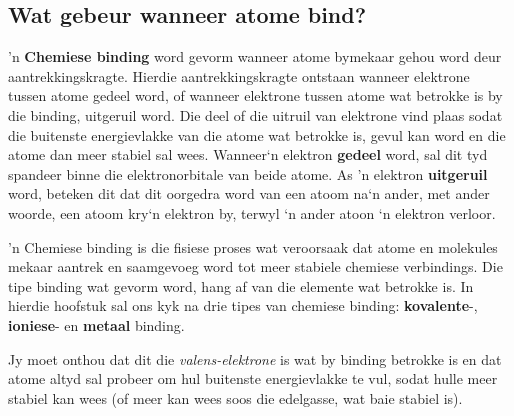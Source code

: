             \subsection*{Wat gebeur wanneer atome bind?}
            \nopagebreak
      \label{m38704*id138842}'n \textbf{Chemiese binding} word gevorm wanneer atome bymekaar gehou word deur aantrekkingskragte. Hierdie aantrekkingskragte ontstaan wanneer elektrone tussen atome gedeel word, of wanneer elektrone tussen atome wat betrokke is by die binding, uitgeruil word. Die deel of die uitruil van elektrone vind plaas sodat die buitenste energievlakke van die atome wat betrokke is, gevul kan word en die atome dan meer stabiel sal wees. Wanneer‘n elektron \textbf{gedeel} word, sal dit tyd spandeer binne die elektronorbitale van beide atome. As 'n elektron \textbf{uitgeruil} word, beteken dit dat dit oorgedra word van een atoom na‘n ander, met ander woorde, een atoom kry‘n elektron by, terwyl ‘n ander atoon ‘n elektron verloor.\par 
\label{m38704*fhsst!!!underscore!!!id83}
 { 'n Chemiese binding is die fisiese proses wat veroorsaak dat atome en molekules mekaar aantrek en saamgevoeg word tot meer stabiele chemiese verbindings.} 
      \label{m38704*id138909}Die tipe binding wat gevorm word, hang af van die elemente wat betrokke is. In hierdie hoofstuk
sal ons kyk na drie tipes van chemiese binding: \textbf{kovalente}-, \textbf{ioniese}- en \textbf{metaal} binding.\par 
      \label{m38704*id138929}
Jy moet onthou dat dit die \textsl{valens-elektrone} is wat by binding betrokke is en dat atome altyd sal probeer om hul buitenste energievlakke te vul, sodat hulle meer stabiel kan wees (of meer kan wees soos die edelgasse, wat baie stabiel is).\par 
